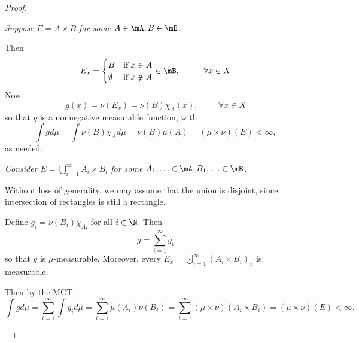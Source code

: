 \documentclass[pmath451]{subfiles}
\begin{document}
    \begin{proof}
        
        \begin{case}
            \textit{Suppose $E=A\times B$ for some $A\in\mA,B\in\mB$.}

            Then
            \begin{equation*}
                E_x = \begin{cases} B & \text{if $x\in A$} \\ \emptyset & \text{if $x\notin A$} \end{cases} \in\mB,  \hspace{1cm}\forall x\in X
            \end{equation*}
            Now
            \begin{equation*}
                g\left( x \right) = \nu\left( E_x \right) = \nu\left( B \right)\chi_A\left( x \right),\hspace{1cm}\forall x\in X
            \end{equation*}
            so that $g$ is a nonnegative measurable function, with
            \begin{equation*}
                \int gd\mu = \int\nu\left( B \right)\chi_Ad\mu = \nu\left( B \right)\mu\left( A \right) = \left( \mu\times \nu \right)\left( E \right)<\infty,
            \end{equation*}
            as needed.
        \end{case}

        \begin{case}
            \textit{Consider $E=\bigcup^{\infty}_{i=1}A_i\times B_i$ for some $A_1,\ldots\in\mA, B_1,\ldots\in\mB$.}

            Without loss of generality, we may assume that the union is disjoint, since intersection of rectangles is still a rectangle.

            Define $g_i=\nu\left( B_i \right)\chi_{A_i}$ for all $i\in\N$. Then
            \begin{equation*}
                g = \sum^{\infty}_{i=1} g_i
            \end{equation*}
            so that $g$ is $\mu$-measurable. Moreover, every $E_x = \bigcupdot^{\infty}_{i=1} \left( A_i\times B_i \right)_x$ is measurable.

            Then by the MCT,
            \begin{equation*}
                \int gd\mu = \sum^{\infty}_{i=1} \int g_id\mu = \sum^{\infty}_{i=1}\mu\left( A_i \right)\nu\left( B_i \right) = \sum^{\infty}_{i=1}\left( \mu\times\nu \right)\left( A_i\times B_i \right) = \left( \mu\times\nu \right)\left( E \right) < \infty.
            \end{equation*}
        \end{case}


\end{proof}
\end{document}
